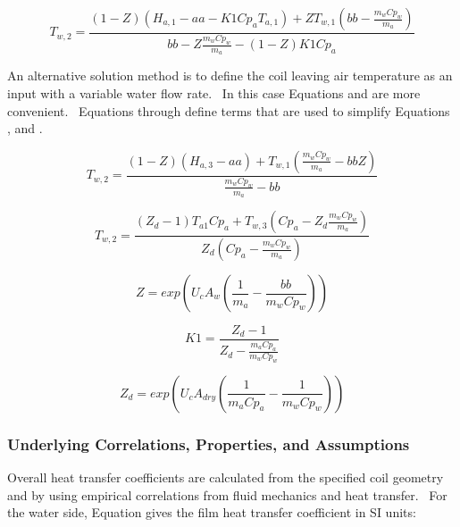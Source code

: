 \begin{equation}
{T_{w,2}} = \frac{{\left( {1 - Z} \right)\left( {{H_{a,1}} - aa - K1 C{p_a} {T_{a,1}}} \right) + Z {T_{w,1}}\left( {bb - \frac{{{m_w}C{p_w}}}{{{m_a}}}} \right)}}{{bb - Z\frac{{{m_w}C{p_w}}}{{{m_a}}} - \left( {1 - Z} \right) K1 C{p_a}}}
\end{equation}

An alternative solution method is to define the coil leaving air temperature as an input with a variable water flow rate.~ In this case Equations and are more convenient.~ Equations through define terms that are used to simplify Equations , and .

\begin{equation}
{T_{w,2}} = \frac{{\left( {1 - Z} \right)\left( {{H_{a,3}} - aa} \right) + {T_{w,1}}\left( {\frac{{{m_w}C{p_w}}}{{{m_a}}} - bb Z} \right)}}{{\frac{{{m_w}C{p_w}}}{{{m_a}}} - bb}}
\end{equation}

\begin{equation}
{T_{w,2}} = \frac{{\left( {{Z_d} - 1} \right){T_{a1}}C{p_a} + {T_{w,3}}\left( {C{p_a} - {Z_d}\frac{{{m_w}C{p_w}}}{{{m_a}}}} \right)}}{{{Z_d}\left( {C{p_a} - \frac{{{m_w}C{p_w}}}{{{m_a}}}} \right)}}
\end{equation}

\begin{equation}
Z = exp\left( {{U_c}{A_w}\left( {\frac{1}{{{m_a}}} - \frac{{bb}}{{{m_w}C{p_w}}}} \right)} \right)
\end{equation}

\begin{equation}
K1 = \frac{{{Z_d} - 1}}{{{Z_d} - \frac{{{m_a}C{p_a}}}{{{m_w}C{p_w}}}}}
\end{equation}

\begin{equation}
{Z_d} = exp\left( {{U_c}{A_{dry}}\left( {\frac{1}{{{m_a}C{p_a}}} - \frac{1}{{{m_w}C{p_w}}}} \right)} \right)
\end{equation}

\subsubsection{Underlying Correlations, Properties, and Assumptions}\label{underlying-correlations-properties-and-assumptions}

Overall heat transfer coefficients are calculated from the specified coil geometry and by using empirical correlations from fluid mechanics and heat transfer.~ For the water side, Equation gives the film heat transfer coefficient in SI units:

